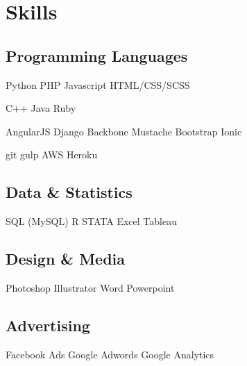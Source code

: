 \section{Skills}
\subsection{Programming Languages}

Python \textbullet{} PHP \textbullet{} Javascript \textbullet{} HTML/CSS/SCSS \\
\sectionsep

C++ \textbullet{} Java \textbullet{} Ruby
\sectionsep

AngularJS \textbullet{} Django \textbullet{} Backbone \textbullet{} Mustache \textbullet{} Bootstrap \textbullet{} Ionic
\sectionsep

git \textbullet{} gulp \textbullet{} AWS \textbullet{} Heroku
\sectionsep

\subsection{Data \& Statistics}
SQL (MySQL) \textbullet{} R \textbullet{} STATA \textbullet{} Excel \textbullet{} Tableau\\
\sectionsep

\subsection{Design \& Media}
Photoshop \textbullet{} Illustrator \textbullet{} Word \textbullet{} Powerpoint \\
\sectionsep

\subsection{Advertising}
Facebook Ads \textbullet{} Google Adwords \textbullet{} Google Analytics \\
\sectionsep
